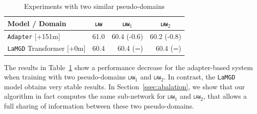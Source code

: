 \documentclass[11pt]{article}
\newcommand{\domain}[1]{\texttt{\textsc{#1}}}
\newcommand{\system}[1]{\texttt{{#1}}}
\begin{document}
\begin{table}[h!]
  \centering
  \begin{tabular}{|p{4cm}|*{3}{r|}} \hline
    Model / Domain & \multicolumn{1}{c|}{\domain{law}} & \multicolumn{1}{c|}{\domain{law$_1$}} & \multicolumn{1}{c|}{\domain{law$_2$}} \\ \hline 
    \system{Adapter}   \hfill{\footnotesize[+151m]}  & 61.0 & 60.4 (-0.6) &  60.2 (-0.8) \\ 
    \system{LaMGD} Transformer   \hfill{\footnotesize[+0m]}  & 60.4 & 60.4 (=) & 60.4 (=) \\ 
    \hline
  \end{tabular}
  \caption{Experiments with two similar pseudo-domains }
  \label{tab:fuzzy}
\end{table}

The results in Table~\ref{tab:fuzzy} show a performance decrease for the adapter-based system when training with two pseudo-domains \domain{law$_1$} and \domain{law$_2$}. In contrast, the \system{LaMGD} model obtains very stable results. In Section~\ref{ssec:abalation}, we show that our algorithm in fact computes the same sub-network for \domain{law$_1$} and \domain{law$_2$}, that allows a full sharing of information between these two pseudo-domains.
\end{document}
